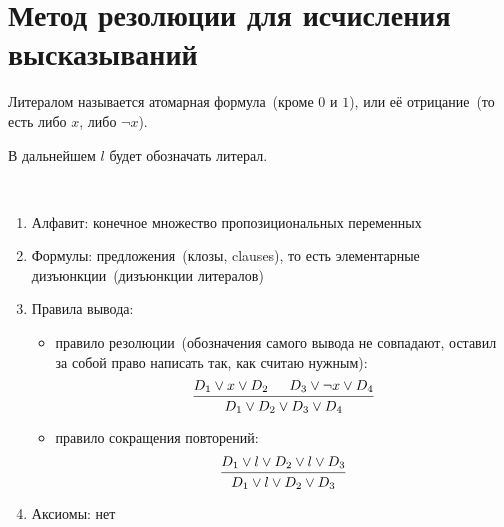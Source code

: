 \documentclass[main]{subfiles}
\begin{document}
\chapter[Метод резолюции]{Метод резолюции для исчисления высказываний}
\begin{definition}[Литерал]
    Литералом называется атомарная формула~(кроме $0$ и $1$), или её отрицание~(то есть либо $x$, либо $\lnot x$).
\end{definition}
В дальнейшем $l$ будет обозначать литерал.
\begin{definition}
    \

    \begin{enumerate}
        \item Алфавит: конечное множество пропозициональных переменных
        \item Формулы: предложения~(клозы, clauses), то есть элементарные дизъюнкции~(дизъюнкции литералов)
        \item Правила вывода:
              \begin{itemize}
                  \item правило резолюции~(обозначения самого вывода не совпадают, оставил за собой право написать так, как считаю нужным):
                        \begin{gather*}
                            \begin{prooftree}
                                \hypo{D_1 \lor x \lor D_2}
                                \hypo{D_3\lor \lnot x\lor D_4}
                                \infer2{D_1\lor D_2 \lor D_3 \lor D_4}
                            \end{prooftree}
                        \end{gather*}
                  \item правило сокращения повторений:
                        \begin{gather*}
                            \begin{prooftree}
                                \hypo{D_1 \lor l\lor D_2\lor l\lor D_3}
                                \infer1{D_1\lor l\lor D_2\lor D_3}
                            \end{prooftree}
                        \end{gather*}
              \end{itemize}
        \item Аксиомы: нет
    \end{enumerate}
\end{definition}
\end{document}
